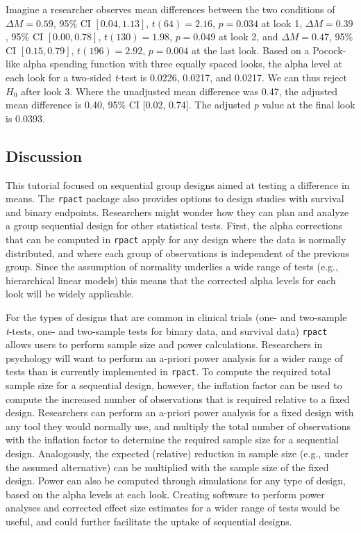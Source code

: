 \documentclass[
  english,
  ,jou, a4paper,floatsintext]{apa6}
\begin{document}
Imagine a researcher observes mean differences between the two conditions of \(\Delta M = 0.59\), 95\% CI \([0.04, 1.13]\), \(t(64) = 2.16\), \(p = 0.034\) at look 1, \(\Delta M = 0.39\), 95\% CI \([0.00, 0.78]\), \(t(130) = 1.98\), \(p = 0.049\) at look 2, and \(\Delta M = 0.47\), 95\% CI \([0.15, 0.79]\), \(t(196) = 2.92\), \(p = 0.004\) at the last look. Based on a Pocock-like alpha spending function with three equally spaced looks, the alpha level at each look for a two-sided \emph{t}-test is 0.0226, 0.0217, and 0.0217. We can thus reject \(H_0\) after look 3. Where the unadjusted mean difference was 0.47, the adjusted mean difference is 0.40, 95\% CI {[}0.02, 0.74{]}. The adjusted \emph{p} value at the final look is 0.0393.

\hypertarget{discussion}{%
\subsection{Discussion}\label{discussion}}

This tutorial focused on sequential group designs aimed at testing a difference in means. The \texttt{rpact} package also provides options to design studies with survival and binary endpoints. Researchers might wonder how they can plan and analyze a group sequential design for other statistical tests. First, the alpha corrections that can be computed in \texttt{rpact} apply for any design where the data is normally distributed, and where each group of observations is independent of the previous group. Since the assumption of normality underlies a wide range of tests (e.g., hierarchical linear models) this means that the corrected alpha levels for each look will be widely applicable.

For the types of designs that are common in clinical trials (one- and two-sample \emph{t}-tests, one- and two-sample tests for binary data, and survival data) \texttt{rpact} allows users to perform sample size and power calculations. Researchers in psychology will want to perform an a-priori power analysis for a wider range of tests than is currently implemented in \texttt{rpact}. To compute the required total sample size for a sequential design, however, the inflation factor can be used to compute the increased number of observations that is required relative to a fixed design. Researchers can perform an a-priori power analysis for a fixed design with any tool they would normally use, and multiply the total number of observations with the inflation factor to determine the required sample size for a sequential design. Analogously, the expected (relative) reduction in sample size (e.g., under the assumed alternative) can be multiplied with the sample size of the fixed design. Power can also be computed through simulations for any type of design, based on the alpha levels at each look. Creating software to perform power analyses and corrected effect size estimates for a wider range of tests would be useful, and could further facilitate the uptake of sequential designs.
\end{document}
